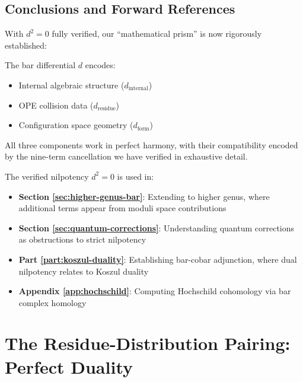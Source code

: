 \subsection{Conclusions and Forward References}

\begin{conclusion}
With $d^2 = 0$ fully verified, our ``mathematical prism'' is now rigorously established:
\begin{center}
\end{center}

The bar differential $d$ encodes:
\begin{itemize}
\item Internal algebraic structure ($d_{\text{internal}}$)
\item OPE collision data ($d_{\text{residue}}$)
\item Configuration space geometry ($d_{\text{form}}$)
\end{itemize}

All three components work in perfect harmony, with their compatibility encoded by
the nine-term cancellation we have verified in exhaustive detail.
\end{conclusion}

\begin{forward}
The verified nilpotency $d^2 = 0$ is used in:
\begin{itemize}
\item \textbf{Section \ref{sec:higher-genus-bar}}: Extending to higher genus,
where additional terms appear from moduli space contributions
\item \textbf{Section \ref{sec:quantum-corrections}}: Understanding quantum corrections
as obstructions to strict nilpotency
\item \textbf{Part \ref{part:koszul-duality}}: Establishing bar-cobar adjunction, where
dual nilpotency relates to Koszul duality
\item \textbf{Appendix \ref{app:hochschild}}: Computing Hochschild cohomology via
bar complex homology
\end{itemize}
\end{forward}


\section{The Residue-Distribution Pairing: Perfect Duality}
\label{sec:residue-distribution-pairing}

